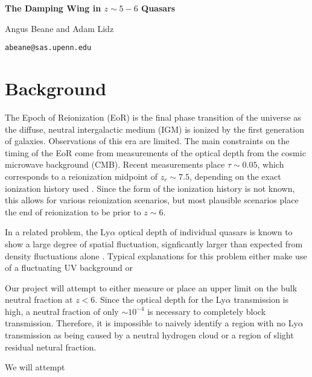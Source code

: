 \documentclass[11pt,letterpaper]{article}
\begin{document}
\thispagestyle{firstpage}%
\ifdefined\dark
    \pagecolor{bggrey}
    \color{white}
\fi

\def\parskipdefault{\parskip}
\setlength{\parskip}{1.2ex}

\def\parindentdefault{\parindent}
\setlength{\parindent}{0pt}

\textbf{The Damping Wing in $z\sim5-6$ Quasars}

Angus Beane and Adam Lidz

\texttt{abeane@sas.upenn.edu}

\deemph{\today}

\section{Background}
The Epoch of Reionization (EoR) is the final phase transition of the universe
as the diffuse, neutral intergalactic medium (IGM) is ionized by the first
generation of galaxies. Observations of this era are limited. The main
constraints on the timing of the EoR come from measurements of the optical
depth from the cosmic microwave background (CMB). Recent measurements place
$\tau \sim 0.05$, which corresponds to a reionization midpoint of $z_r \sim
7.5$, depending on the exact ionization history used
\citep{2018arXiv180706209P}. Since the form of the ionization history is not
known, this allows for various reionization scenarios, but most plausible
scenarios place the end of reionization to be prior to $z\sim6$.

In a related problem, the Ly$\alpha$ optical depth of individual quasars is
known to show a large degree of spatial fluctuation, signficantly larger than
expected from density fluctuations alone \citep[e.g.][]{2015PASA...32...45B}.
Typical explanations for this problem either make use of a fluctuating UV
background \citep{2017MNRAS.465.3429C} or

Our project will attempt to either measure or place an upper limit on the bulk
neutral fraction at $z<6$. Since the optical depth for the Ly$\alpha$
transmission is high, a neutral fraction of only $\sim10^{-4}$ is necessary to
completely block transmission. Therefore, it is impossible to naively identify
a region with no Ly$\alpha$ transmission as being caused by a neutral hydrogen
cloud or a region of slight residual netural fraction.

We will attempt 


\end{document}
